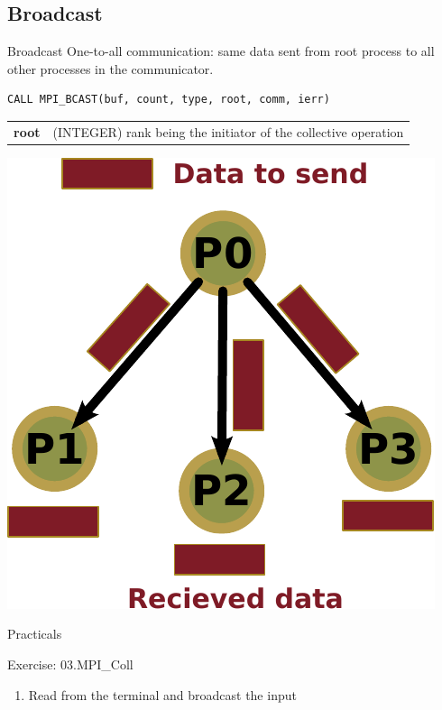 \documentclass[aspectratio=43]{beamer}
\begin{document}
\subsection{Broadcast}
\begin{frame}[fragile]{Broadcast}
One-to-all communication: same data sent from root process to all other processes in the communicator.\\
\footnotesize
\begin{verbatim}
CALL MPI_BCAST(buf, count, type, root, comm, ierr)
\end{verbatim}
\begin{black1block}{}
\begin{tabular}{rp{8cm}}
\textbf{root} & (INTEGER) rank being the initiator of the collective operation\\
\end{tabular}
\end{black1block}
\begin{center}
\includegraphics[scale=0.5]{03.MPI_Coll/broadcast.pdf}
\end{center}
\end{frame}

\begin{frame}{Practicals}
\begin{brown2block}{Exercise: 03.MPI\_Coll}
    \begin{enumerate}
        \item Read from the terminal and broadcast the input
    \end{enumerate}
    \end{brown2block}
\end{frame}
\end{document}
